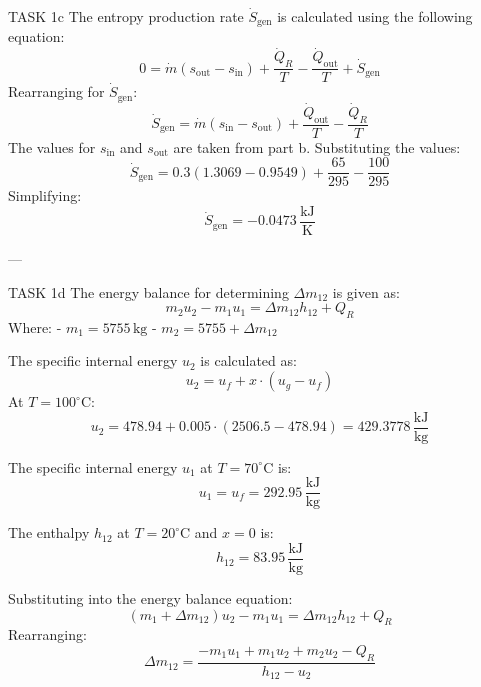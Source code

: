 TASK 1c  
The entropy production rate \( \dot{S}_{\text{gen}} \) is calculated using the following equation:  
\[
0 = \dot{m} (s_{\text{out}} - s_{\text{in}}) + \frac{\dot{Q}_R}{T} - \frac{\dot{Q}_{\text{out}}}{T} + \dot{S}_{\text{gen}}
\]  
Rearranging for \( \dot{S}_{\text{gen}} \):  
\[
\dot{S}_{\text{gen}} = \dot{m} (s_{\text{in}} - s_{\text{out}}) + \frac{\dot{Q}_{\text{out}}}{T} - \frac{\dot{Q}_R}{T}
\]  
The values for \( s_{\text{in}} \) and \( s_{\text{out}} \) are taken from part b. Substituting the values:  
\[
\dot{S}_{\text{gen}} = 0.3 (1.3069 - 0.9549) + \frac{65}{295} - \frac{100}{295}
\]  
Simplifying:  
\[
\dot{S}_{\text{gen}} = -0.0473 \, \frac{\text{kJ}}{\text{K}}
\]  

---

TASK 1d  
The energy balance for determining \( \Delta m_{12} \) is given as:  
\[
m_2 u_2 - m_1 u_1 = \Delta m_{12} h_{12} + Q_R
\]  
Where:  
- \( m_1 = 5755 \, \text{kg} \)  
- \( m_2 = 5755 + \Delta m_{12} \)  

The specific internal energy \( u_2 \) is calculated as:  
\[
u_2 = u_f + x \cdot (u_g - u_f)
\]  
At \( T = 100^\circ\text{C} \):  
\[
u_2 = 478.94 + 0.005 \cdot (2506.5 - 478.94) = 429.3778 \, \frac{\text{kJ}}{\text{kg}}
\]  

The specific internal energy \( u_1 \) at \( T = 70^\circ\text{C} \) is:  
\[
u_1 = u_f = 292.95 \, \frac{\text{kJ}}{\text{kg}}
\]  

The enthalpy \( h_{12} \) at \( T = 20^\circ\text{C} \) and \( x = 0 \) is:  
\[
h_{12} = 83.95 \, \frac{\text{kJ}}{\text{kg}}
\]  

Substituting into the energy balance equation:  
\[
(m_1 + \Delta m_{12}) u_2 - m_1 u_1 = \Delta m_{12} h_{12} + Q_R
\]  
Rearranging:  
\[
\Delta m_{12} = \frac{-m_1 u_1 + m_1 u_2 + m_2 u_2 - Q_R}{h_{12} - u_2}
\]  